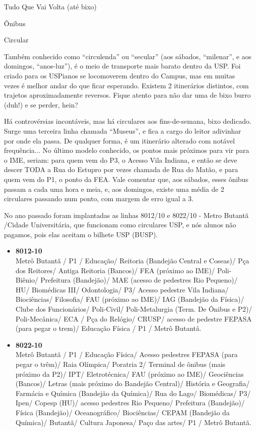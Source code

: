 \begin{secao}{Tudo Que Vai Volta (até bixo)}
\begin{subsecao}{Ônibus}
\end{subsecao}

\begin{subsecao}{Circular}

Também conhecido como ``circulenda'' ou ``secular'' (aos sábados, ``milenar'', e aos domingos, ``anos-luz''), é o meio de transporte mais barato dentro da USP. Foi criado para os USPianos se locomoverem dentro do Campus, mas em muitas vezes é melhor andar do que ficar esperando. Existem 2 itinerários distintos, com trajetos aproximadamente reversos. Fique atento para não dar uma de bixo burro (duh!) e se perder, hein? 

Há controvérsias incontáveis, mas há circulares aos fins-de-semana, bixo dedicado. Surge uma terceira linha chamada “Museus”, e fica a cargo do leitor adivinhar por onde ela passa. De qualquer forma, é um itinerário alterado com notável frequência... No último modelo conhecido, os pontos mais próximos para vir para o IME, seriam: para quem vem do P3, o Acesso Vila Indiana, e então se deve descer TODA a Rua do Estupro por vezes chamada de Rua do Matão, e para quem vem do P1, o ponto da FEA. Vale comentar que, aos sábados, esses ônibus passam a cada uma hora e meia, e, aos domingos, existe uma média de 2 circulares passando num ponto, com margem de erro igual a 3. 

No ano passado foram implantadas as linhas 8012/10 e 8022/10 - Metro Butantã /Cidade Universitária, que funcionam como circulares USP, e nós alunos não pagamos, pois elas aceitam o bilhete USP (BUSP).

\begin{itemize}
  \item {\bf 8012-10}\\
    Metrô Butantã / P1 / Educação/ Reitoria (Bandejão Central e
    Coseas)/ Pça dos Reitores/ Antiga Reitoria (Bancos)/ FEA (próximo ao IME)/
    Poli-Biênio/ Prefeitura (Bandejão)/ MAE (acesso de pedestres Rio Pequeno)/
    HU/ Biomédicas III/ Odontologia/ P3/ Acesso pedestre Vila Indiana/ 	  
    Biociências/ Filosofia/
    FAU (próximo ao IME)/ IAG (Bandejão da Física)/ Clube dos Funcionários/
    Poli-Civil/ Poli-Metalurgia (Term. De Ônibus e P2)/ Poli-Mecânica/ ECA / 
    Pça do Relógio/ CRUSP/ acesso de pedestre FEPASA (para pegar o trem)/ 
    Educação Física / P1 / Metrô Butantã.

  \item {\bf 8022-10}\\
    Metrô Butantã / P1 / Educação Física/ Acesso pedestres FEPASA (para
    pegar o trêm)/ Raia Olímpica/ Poratria 2/ Terminal de ônibus (mais próximo
    da P2)/ IPT/ Eletrotécnica/ FAU (próximo ao IME)/ Geociências (Bancos)/
    Letras (mais próximo do Bandejão Central)/ História e Geografia/ Farmácia e
    Química (Bandejão da Química)/ Rua do Lago/ Biomédicas/ P3/ Ipen/ Copesp
    (HU)/ acesso pedestres Rio Pequeno/
    Prefeitura (Bandejão)/ Física (Bandejão)/ Oceanográfico/ Biociências/ CEPAM
    (Bandejão da Química)/ Butantã/ Cultura Japonesa/ Paço das artes/
    P1 / Metrô Butantã.
    

\end{itemize}
\end{subsecao}
\end{secao}
